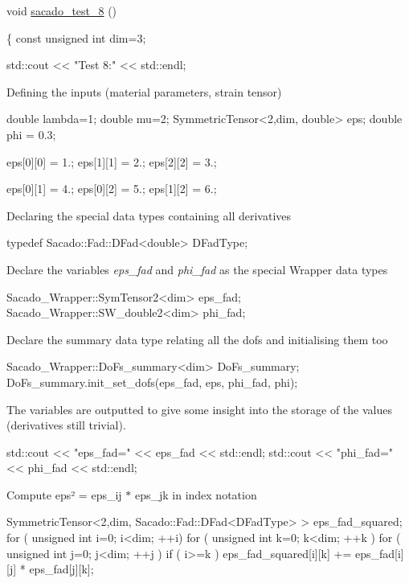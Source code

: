 \begin{DoxyCode}
\textcolor{keywordtype}{void} \hyperlink{example__code__to__be__documented_8cc_aa7108ff8393b98d66dfef50899d048d9}{sacado\_test\_8} ()
 
\{
    \textcolor{keyword}{const} \textcolor{keywordtype}{unsigned} \textcolor{keywordtype}{int} dim=3;
 
    std::cout << \textcolor{stringliteral}{"Test 8:"} << std::endl;
\end{DoxyCode}
 Defining the inputs (material parameters, strain tensor) 
\begin{DoxyCode}
\textcolor{keywordtype}{double} lambda=1;
\textcolor{keywordtype}{double} mu=2;
SymmetricTensor<2,dim, double> eps;
\textcolor{keywordtype}{double} phi = 0.3;

eps[0][0] = 1.;
eps[1][1] = 2.;
eps[2][2] = 3.;

eps[0][1] = 4.;
eps[0][2] = 5.;
eps[1][2] = 6.;
\end{DoxyCode}
 Declaring the special data types containing all derivatives 
\begin{DoxyCode}
\textcolor{keyword}{typedef} Sacado::Fad::DFad<double> DFadType;
\end{DoxyCode}
 Declare the variables {\itshape eps\+\_\+fad} and {\itshape phi\+\_\+fad} as the special Wrapper data types 
\begin{DoxyCode}
Sacado\_Wrapper::SymTensor2<dim> eps\_fad;
Sacado\_Wrapper::SW\_double2<dim> phi\_fad;
\end{DoxyCode}
 Declare the summary data type relating all the dofs and initialising them too 
\begin{DoxyCode}
Sacado\_Wrapper::DoFs\_summary<dim> DoFs\_summary;
DoFs\_summary.init\_set\_dofs(eps\_fad, eps, phi\_fad, phi);
\end{DoxyCode}
 The variables are outputted to give some insight into the storage of the values (derivatives still trivial). 
\begin{DoxyCode}
std::cout << \textcolor{stringliteral}{"eps\_fad="} << eps\_fad << std::endl;
std::cout << \textcolor{stringliteral}{"phi\_fad="} << phi\_fad << std::endl;
\end{DoxyCode}
 Compute eps² = eps\+\_\+ij $\ast$ eps\+\_\+jk in index notation 
\begin{DoxyCode}
SymmetricTensor<2,dim, Sacado::Fad::DFad<DFadType> > eps\_fad\_squared;
\textcolor{keywordflow}{for} ( \textcolor{keywordtype}{unsigned} \textcolor{keywordtype}{int} i=0; i<dim; ++i)
   \textcolor{keywordflow}{for} ( \textcolor{keywordtype}{unsigned} \textcolor{keywordtype}{int} k=0; k<dim; ++k )
       \textcolor{keywordflow}{for} ( \textcolor{keywordtype}{unsigned} \textcolor{keywordtype}{int} j=0; j<dim; ++j )
           \textcolor{keywordflow}{if} ( i>=k )
               eps\_fad\_squared[i][k] += eps\_fad[i][j] * eps\_fad[j][k];
\end{DoxyCode}
